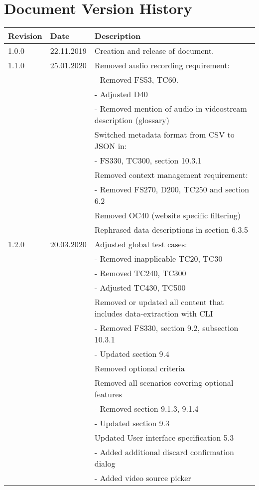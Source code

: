 \chapter*{Document Version History}
\label{ch:versionhistory}
\begin{table}[h]
\begin{tabular}{lll}
\textbf{Revision} & \textbf{Date} & \textbf{Description}              \\
\hline
1.0.0             & 22.11.2019    & Creation and release of document. \\
\hline
1.1.0             & 25.01.2020    & Removed audio recording requirement: \\
&& - Removed FS53, TC60. \\
&& - Adjusted D40 \\
&& - Removed mention of audio in \gls{videostream} description (glossary) \\
&& Switched metadata format from CSV to JSON in:\\
&& - FS330, TC300, section 10.3.1 \\
&& Removed context management requirement:\\
&& - Removed FS270, D200, TC250 and section 6.2\\
&& Removed OC40 (website specific filtering)\\
&& Rephrased data descriptions in section 6.3.5\\
\hline
1.2.0           & 20.03.2020    & Adjusted global test cases: \\
&& - Removed inapplicable TC20, TC30\\
&& - Removed TC240, TC300\\
&& - Adjusted TC430, TC500\\
&& Removed or updated all content that includes data-extraction with CLI\\
&& - Removed FS330, section 9.2, subsection 10.3.1\\
&& - Updated section 9.4\\
&& Removed optional criteria\\
&& Removed all scenarios covering optional features\\
&& - Removed section 9.1.3, 9.1.4\\
&& - Updated section 9.3\\
&& Updated User interface specification 5.3\\
&& - Added additional discard confirmation dialog\\
&& - Added video source picker\\
\end{tabular}
\end{table}